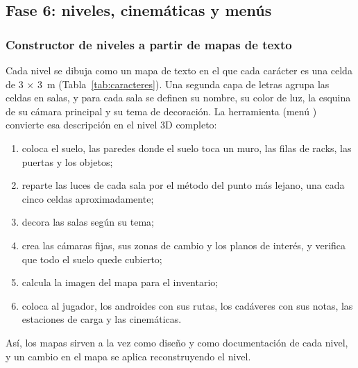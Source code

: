 \subsection{Fase 6: niveles, cinemáticas y menús}

\subsubsection{Constructor de niveles a partir de mapas de texto}

Cada nivel se dibuja como un mapa de texto en el que cada carácter es una celda de 3 × 3~m
(Tabla~\ref{tab:caracteres}). Una segunda capa de letras agrupa las celdas en salas, y para cada sala
se definen su nombre, su color de luz, la esquina de su cámara principal y su tema de decoración. La
herramienta  (menú  \textrightarrow{} ) convierte
esa descripción en el nivel 3D completo:

\begin{enumerate}
  \item coloca el suelo, las paredes donde el suelo toca un muro, las filas de racks, las puertas
        y los objetos;
  \item reparte las luces de cada sala por el método del punto más lejano, una cada cinco celdas
        aproximadamente;
  \item decora las salas según su tema;
  \item crea las cámaras fijas, sus zonas de cambio y los planos de interés, y verifica que todo el
        suelo quede cubierto;
  \item calcula la imagen del mapa para el inventario;
  \item coloca al jugador, los androides con sus rutas, los cadáveres con sus notas, las
        estaciones de carga y las cinemáticas.
\end{enumerate}

Así, los mapas sirven a la vez como diseño y como documentación de cada nivel, y un cambio en el
mapa se aplica reconstruyendo el nivel.

